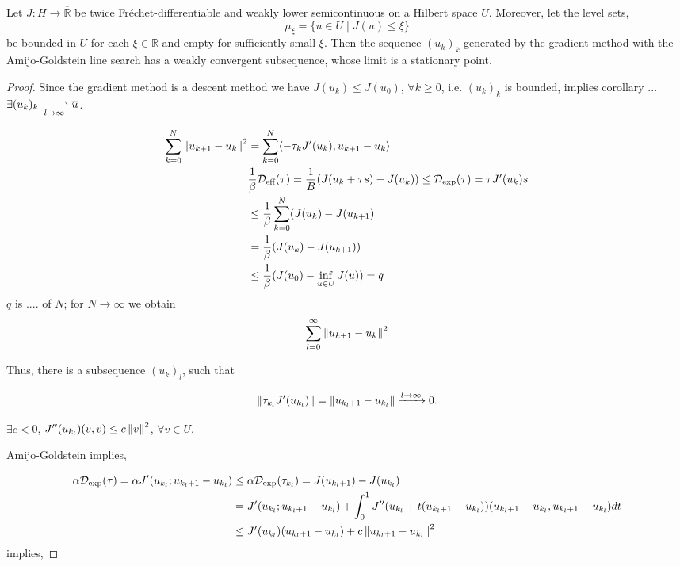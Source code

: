 \begin{theorem}
	Let $J:H\rightarrow \overline{\mathbb{R}}$ be twice Fr\'echet-differentiable and weakly lower semicontinuous on a Hilbert space $U$. Moreover, let the level sets,
	\[
		\mu_\xi = \{ u \in U \mid J(u)\leq \xi \}
	\]
	be bounded in $U$ for each $\xi \in \mathbb{R}$ and empty for sufficiently small $\xi$. Then the sequence $(u_k)_k$ generated by the gradient method with the Amijo-Goldstein line search has a weakly convergent subsequence, whose limit is a stationary point. 
	
	\begin{proof}
		Since the gradient method is a descent method we have $J(u_k) \leq J(u_0)$, $\forall k \geq 0$,
		i.e. $(u_k)_k$ is bounded, implies corollary ... $\exists (u_k)_k \xrightharpoonup[l\rightarrow\infty]{} \overline{u}$.
		
		\begin{align*}
			\sum_{k=0}^N \left\lVert u_{k+1}-u_k\right\rVert^2 &= \sum_{k=0}^N \langle -\tau_k J'(u_k), u_{k+1}-u_{k}\rangle \\
			&\frac{1}{\beta} \mathcal{D}_{\text{eff}}(\tau)=\frac{1}{B}(J(u_k+\tau s)-J(u_k)) \leq \mathcal{D}_{\text{exp}}(\tau)=\tau J'(u_k)s\\
			&\leq \frac{1}{\beta} \sum_{k=0}^{N} (J(u_k)-J(u_{k+1}) \\&= \frac{1}{\beta} (J(u_k)-J(u_{k+1})) \\
			&\leq \frac{1}{\beta} (J(u_0)-\inf_{u\in U} J(u)) = q
		\end{align*}
	$q$ is .... of $N$; for $N\rightarrow \infty$ we obtain \[
	\sum_{l=0}^{\infty} \left\lVert u_{k+1}-u_{k}\right\rVert^2
	\]
	
	Thus, there is a subsequence $(u_k)_l$, such that
	
	\[
	\left\lVert\tau_{k_l}J'(u_{k_l})\right\rVert=\left\lVert u_{{k_l}+1}-u_{k_l}\right\rVert \xrightarrow{l\rightarrow \infty} 0.
	\]
	
	$\exists c <0$, $J''(u_{k_l})(v,v)\leq c \left\lVert v\right\rVert^2$, $\forall v \in U$.
	
	Amijo-Goldstein implies,
	
	\begin{align*}
		\alpha \mathcal{D}_{\text{exp}} (\tau) = \alpha J'(u_{k_l};u_{{k_l}+1}-u_{{k_l}}) &\leq \alpha \mathcal{D}_{\text{exp}}(\tau_{k_l})= J(u_{k_l+1})-J(u_{k_l}) \\
		&= J'(u_{k_l};u_{k_l+1}-u_{k_l}) + \int_{0}^{1} J''(u_{k_l}+t(u_{k_l+1}-u_{k_l})) (u_{k_l+1}-u_{k_l}, u_{k_l+1}-u_{k_l}) dt \\
		& \leq J'(u_{k_l}) (u_{k_l+1}-u_{k_l}) + c \left\lVert u_{k_l+1}-u_{k_l}\right\rVert^2
		\end{align*}
	implies,
	

\end{proof}
\end{theorem}
